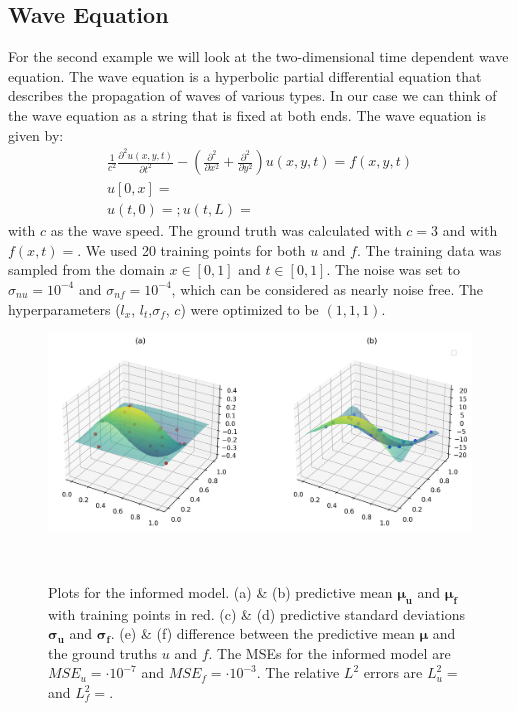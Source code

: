 \documentclass{article}
\begin{document}
\subsection{Wave Equation}
For the second example we will look at the two-dimensional time dependent wave equation. The wave equation is a hyperbolic partial differential equation that describes the propagation of waves of various types. In our case we can think of the wave equation as a string that is fixed at both ends. The wave equation is given by:
\begin{equation}
    \begin{aligned}
        \frac{1}{c^2} \frac{\partial^2 u(x,y,t)}{\partial t^2} - (\frac{\partial^2}{\partial x^2} +\frac{\partial^2}{\partial y^2})u(x,y,t) = f(x,y,t) \\ u[0,x] =\\ u(t,0) = ; u(t,L) =
    \end{aligned}
\end{equation}
with $c$ as the wave speed. The ground truth was calculated with $c = 3$ and with $f(x,t) = $. We used 20 training points for both $u$ and $f$. The training data was sampled from the domain $x \in [0,1]$ and $t \in [0,1]$. The noise was set to $\sigma_{nu} = 10^{-4}$ and $\sigma_{nf} = 10^{-4}$, which can be considered as nearly noise free. The hyperparameters ($l_x$, $l_t$,$\sigma_f$, $c$) were optimized to be $(1,1,1)$.
\begin{figure}
    \centering
    \includegraphics[width=1\textwidth]{../final_examples/wave_equation/predictive_mean.png}
    \caption{Plots for the informed model. (a) \& (b) predictive mean $\bm{\mu_u}$ and $\bm{\mu_f}$ with training points in red. (c) \& (d) predictive standard deviations $\bm{\sigma_u}$ and $\bm{\sigma_f}$. (e) \& (f) difference between the predictive mean $\bm{\mu}$ and the ground truths $u$ and $f$. The MSEs for the informed model are $MSE_u =  \cdot 10^{-7}$ and $MSE_f =  \cdot 10^{-3}$. The relative $L^2$ errors are $L^2_u = $ and $L^2_f = $.}
    ~\label{fig:wave}
\end{figure}
\end{document}
